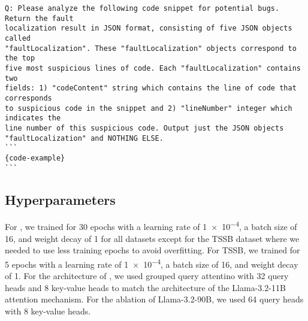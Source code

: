 \begin{lstlisting}[frame=single]
Q: Please analyze the following code snippet for potential bugs. Return the fault
localization result in JSON format, consisting of five JSON objects called
"faultLocalization". These "faultLocalization" objects correspond to the top
five most suspicious lines of code. Each "faultLocalization" contains two
fields: 1) "codeContent" string which contains the line of code that corresponds
to suspicious code in the snippet and 2) "lineNumber" integer which indicates the
line number of this suspicious code. Output just the JSON objects
"faultLocalization" and NOTHING ELSE.
```
{code-example}
```
\end{lstlisting}






\subsection{Hyperparameters}
\label{app:hyperparams}

For \ourmethod{}, we trained for 30 epochs with a learning rate of \num{1e-4}, a batch size of 16, and weight decay of 1 for all datasets except for the TSSB dataset where we needed to use less training epochs to avoid overfitting. For TSSB, we trained for 5 epochs with a learning rate of \num{1e-4}, a batch size of 16, and weight decay of 1. For the architecture of \ourmethod{}, we used grouped query attentino with 32 query heads and 8 key-value heads to match the architecture of the Llama-3.2-11B attention mechanism. For the ablation of Llama-3.2-90B, we used 64 query heads with 8 key-value heads.

